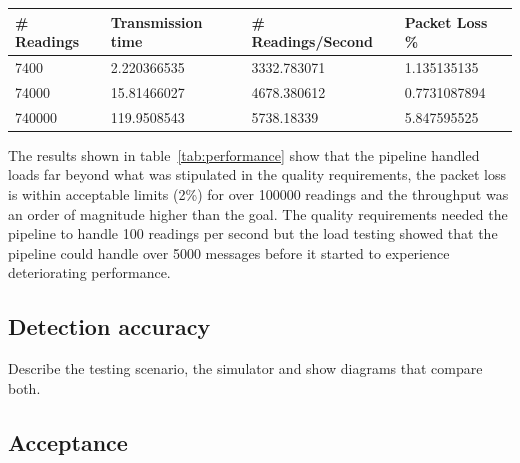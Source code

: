 \documentclass[prodmode,acmtosem]{acmsmall} %
\begin{document}
\begin{center}
\begin{tabularx}{\textwidth}{| X | X | X | X |} 
\hline
\# Readings & Transmission time & \# Readings/Second & Packet Loss \% \\
\hline
7400 & 2.220366535 & 3332.783071 & 1.135135135 \\
\hline
74000 & 15.81466027 & 4678.380612 & 0.7731087894 \\
\hline
740000 & 119.9508543 & 5738.18339 & 5.847595525 \\
\hline
\end{tabularx}
\label{tab:performance}
\end{center}

The results shown in table~\ref{tab:performance} show that the pipeline handled loads far beyond what was stipulated in the quality requirements, the packet loss is within acceptable limits (2\%) for over 100000 readings and the throughput was an order of magnitude higher than the goal. The quality requirements needed the pipeline to handle 100 readings per second but the load testing showed that the pipeline could handle over 5000 messages before it started to experience deteriorating performance.



\subsection{Detection accuracy}
Describe the testing scenario, the simulator and show diagrams that compare both.


\subsection{Acceptance}
\end{document}
